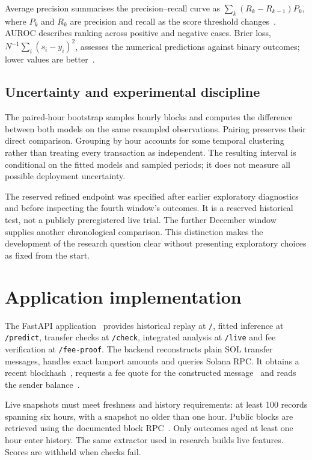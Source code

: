 \documentclass[12pt,a4paper,oneside]{report}
\begin{document}
Average precision summarises the precision--recall curve as $\sum_k(R_k-R_{k-1})P_k$, where $P_k$ and $R_k$ are precision and recall as the score threshold changes~\cite{ap}. AUROC describes ranking across positive and negative cases. Brier loss, $N^{-1}\sum_i(s_i-y_i)^2$, assesses the numerical predictions against binary outcomes; lower values are better~\cite{brier}.
\subsection{Uncertainty and experimental discipline}
The paired-hour bootstrap samples hourly blocks and computes the difference between both models on the same resampled observations. Pairing preserves their direct comparison. Grouping by hour accounts for some temporal clustering rather than treating every transaction as independent. The resulting interval is conditional on the fitted models and sampled periods; it does not measure all possible deployment uncertainty.

The reserved refined endpoint was specified after earlier exploratory diagnostics and before inspecting the fourth window's outcomes. It is a reserved historical test, not a publicly preregistered live trial. The further December window supplies another chronological comparison. This distinction makes the development of the research question clear without presenting exploratory choices as fixed from the start.

\section{Application implementation}
The FastAPI application~\cite{fastapi} provides historical replay at \texttt{/}, fitted inference at \texttt{/predict}, transfer checks at \texttt{/check}, integrated analysis at \texttt{/live} and fee verification at \texttt{/fee-proof}. The backend reconstructs plain SOL transfer messages, handles exact lamport amounts and queries Solana RPC. It obtains a recent blockhash~\cite{blockhash}, requests a fee quote for the constructed message~\cite{feequote} and reads the sender balance~\cite{balance}.

Live snapshots must meet freshness and history requirements: at least 100 records spanning six hours, with a snapshot no older than one hour. Public blocks are retrieved using the documented block RPC~\cite{getblock}. Only outcomes aged at least one hour enter history. The same extractor used in research builds live features. Scores are withheld when checks fail.
\end{document}
